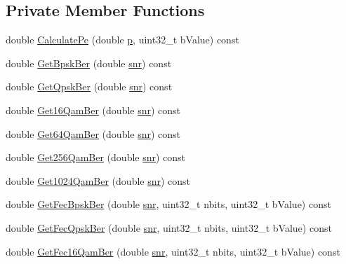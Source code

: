 \subsection*{Private Member Functions}
\begin{DoxyCompactItemize}
\item 
double \hyperlink{classns3_1_1NistErrorRateModel_ad7f5de2eeb88e8e1289705d1fe610a13}{Calculate\+Pe} (double \hyperlink{lte__link__budget__x2__handover__measures_8m_ac9de518908a968428863f829398a4e62}{p}, uint32\+\_\+t b\+Value) const 
\item 
double \hyperlink{classns3_1_1NistErrorRateModel_a6a5bc0d428d735c1aec6ebaf6675bdfb}{Get\+Bpsk\+Ber} (double \hyperlink{lte__pathloss_8m_ae6e82a215dff6b79fb6e9952a1b78453}{snr}) const 
\item 
double \hyperlink{classns3_1_1NistErrorRateModel_ae7c7e08da61267e108f92b33f05300cf}{Get\+Qpsk\+Ber} (double \hyperlink{lte__pathloss_8m_ae6e82a215dff6b79fb6e9952a1b78453}{snr}) const 
\item 
double \hyperlink{classns3_1_1NistErrorRateModel_ab6db7e685d32fa8172d61e1d80adaf64}{Get16\+Qam\+Ber} (double \hyperlink{lte__pathloss_8m_ae6e82a215dff6b79fb6e9952a1b78453}{snr}) const 
\item 
double \hyperlink{classns3_1_1NistErrorRateModel_aafe1121a6ac81f5d8bfa95f0748bbeff}{Get64\+Qam\+Ber} (double \hyperlink{lte__pathloss_8m_ae6e82a215dff6b79fb6e9952a1b78453}{snr}) const 
\item 
double \hyperlink{classns3_1_1NistErrorRateModel_a86a8e9df225e8f332d1c30203cbd6034}{Get256\+Qam\+Ber} (double \hyperlink{lte__pathloss_8m_ae6e82a215dff6b79fb6e9952a1b78453}{snr}) const 
\item 
double \hyperlink{classns3_1_1NistErrorRateModel_aa4767dd8e74be017c6be9b2b56fa2835}{Get1024\+Qam\+Ber} (double \hyperlink{lte__pathloss_8m_ae6e82a215dff6b79fb6e9952a1b78453}{snr}) const 
\item 
double \hyperlink{classns3_1_1NistErrorRateModel_a556148c8f5751a3784e8f5c8d76cedfc}{Get\+Fec\+Bpsk\+Ber} (double \hyperlink{lte__pathloss_8m_ae6e82a215dff6b79fb6e9952a1b78453}{snr}, uint32\+\_\+t nbits, uint32\+\_\+t b\+Value) const 
\item 
double \hyperlink{classns3_1_1NistErrorRateModel_afbb3d9290227e060dffe73fb8bc959a9}{Get\+Fec\+Qpsk\+Ber} (double \hyperlink{lte__pathloss_8m_ae6e82a215dff6b79fb6e9952a1b78453}{snr}, uint32\+\_\+t nbits, uint32\+\_\+t b\+Value) const 
\item 
double \hyperlink{classns3_1_1NistErrorRateModel_a61f2f3fa2a7fd07ddeffb631ae6732cc}{Get\+Fec16\+Qam\+Ber} (double \hyperlink{lte__pathloss_8m_ae6e82a215dff6b79fb6e9952a1b78453}{snr}, uint32\+\_\+t nbits, uint32\+\_\+t b\+Value) const 

\end{DoxyCompactItemize}
